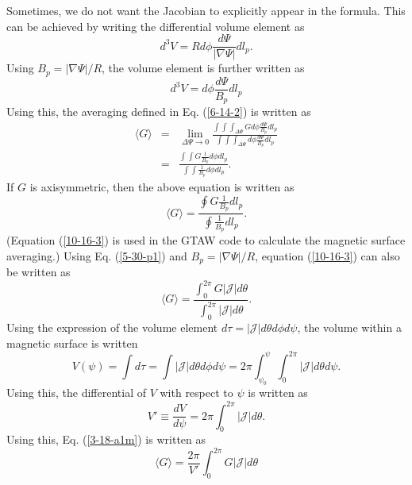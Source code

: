 \documentclass{llncs}
\begin{document}
\hrulefill

Sometimes, we do not want the Jacobian to explicitly appear in the formula.
This can be achieved by writing the differential volume element as
\begin{equation}
  \label{6-14-1} d^3 V = R d \phi \frac{d \Psi}{| \nabla \Psi |} d l_p .
\end{equation}
Using $B_p = | \nabla \Psi | / R$, the volume element is further written as
\begin{equation}
  d^3 V = d \phi \frac{d \Psi}{B_p} d l_p
\end{equation}
Using this, the averaging defined in Eq. (\ref{6-14-2}) is written as
\begin{eqnarray}
  \langle G \rangle & = & \lim_{\Delta \Psi \rightarrow 0} \frac{\int \int
  \int_{\Delta \Psi} G d \phi \frac{d \Psi}{B_p} d l_p}{\int \int \int_{\Delta
  \Psi} d \phi \frac{d \Psi}{B_p} d l_p} \nonumber\\
  & = & \frac{\int \int G \frac{1}{B_p} d \phi d l_p}{\int \int \frac{1}{B_p}
  d \phi d l_p} . 
\end{eqnarray}
If $G$ is axisymmetric, then the above equation is written as
\begin{equation}
  \label{10-16-3} \langle G \rangle = \frac{\oint G \frac{1}{B_p} d l_p}{\oint
  \frac{1}{B_p} d l_p} .
\end{equation}
(Equation (\ref{10-16-3}) is used in the GTAW code to calculate the magnetic
surface averaging.) Using Eq. (\ref{5-30-p1}) and $B_p = | \nabla \Psi | / R$,
equation (\ref{10-16-3}) can also be written as
\begin{equation}
  \label{3-18-a1m} \langle G \rangle = \frac{\int_0^{2 \pi} G |\mathcal{J}| d
  \theta}{\int_0^{2 \pi} |\mathcal{J}| d \theta} .
\end{equation}
Using the expression of the volume element $d \tau = |\mathcal{J}| d \theta d
\phi d \psi$, the volume within a magnetic surface is written
\begin{equation}
  \label{4-18-3} V (\psi) = \int d \tau = \int |\mathcal{J}| d \theta d \phi d
  \psi = 2 \pi \int_{\psi_0}^{\psi} \int_0^{2 \pi} |\mathcal{J}| d \theta d
  \psi .
\end{equation}
Using this, the differential of $V$ with respect to $\psi$ is written as
\begin{equation}
  \label{4-7-p1} V' \equiv \frac{d V}{d \psi} = 2 \pi \int_0^{2 \pi}
  |\mathcal{J}| d \theta .
\end{equation}
Using this, Eq. (\ref{3-18-a1m}) is written as
\[ \langle G \rangle = \frac{2 \pi}{V'} \int_0^{2 \pi} G |\mathcal{J}| d
   \theta \]
\end{document}
